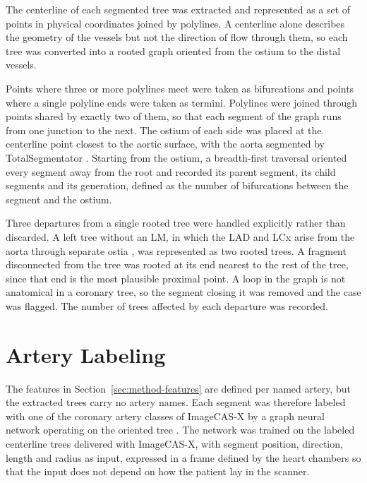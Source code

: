 The centerline of each segmented tree was extracted and represented as a set of points in physical
coordinates joined by polylines.
A centerline alone describes the geometry of the vessels but not the direction of flow through
them, so each tree was converted into a rooted graph oriented from the ostium to the distal
vessels.

Points where three or more polylines meet were taken as bifurcations and points where a single
polyline ends were taken as termini.
Polylines were joined through points shared by exactly two of them, so that each segment of the
graph runs from one junction to the next.
The ostium of each side was placed at the centerline point closest to the aortic surface, with
the aorta segmented by TotalSegmentator \cite{wasserthal2023totalsegmentator}.
Starting from the ostium, a breadth-first traversal oriented every segment away from the root and
recorded its parent segment, its child segments and its generation, defined as the number of
bifurcations between the segment and the ostium.

Three departures from a single rooted tree were handled explicitly rather than discarded.
A left tree without an LM, in which the LAD and LCx arise from the aorta through separate ostia
\cite{topaz1991absentlm}, was represented as two rooted trees.
A fragment disconnected from the tree was rooted at its end nearest to the rest of the tree, since
that end is the most plausible proximal point.
A loop in the graph is not anatomical in a coronary tree, so the segment closing it was removed
and the case was flagged.
The number of trees affected by each departure was recorded.


\section{Artery Labeling}
\label{sec:method-labeling}

The features in Section~\ref{sec:method-features} are defined per named artery, but the extracted
trees carry no artery names.
Each segment was therefore labeled with one of the coronary artery classes of ImageCAS-X by a
graph neural network operating on the oriented tree \cite{hampe2024gnn}.
The network was trained on the labeled centerline trees delivered with ImageCAS-X, with segment
position, direction, length and radius as input, expressed in a frame defined by the heart
chambers so that the input does not depend on how the patient lay in the scanner.

